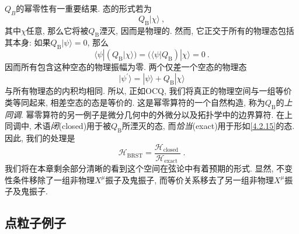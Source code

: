 $Q_B$的幂零性有一重要结果. 态的形式若为
\begin{equation}\label{4.2.15}
Q_{\mathrm{B}}|\chi\rangle \:,
\end{equation}
其中$\chi$任意, 那么它将被$Q_{\mathrm{B}}$湮灭, 因而是物理的. 然而, 它正交于所有的物理态包括其本身: 如果$Q_{\mathrm{B}}|\psi\rangle=0$, 那么
\begin{equation}
\langle\psi| (Q_{\mathrm{B}}|\chi\rangle)= (\langle\psi| Q_{\mathrm{B}})|\chi\rangle=0 \:. \label{4.2.16}
\end{equation}
因而所有包含这种空态的物理振幅为零. 两个仅差一个空态的物理态
\begin{equation}
\lvert \psi^{\prime} \rangle=|\psi\rangle+Q_{\mathrm{B}}|\chi\rangle \label{4.2.17}
\end{equation}
与所有物理态的内积均相同. 所以, 正如OCQ, 我们将真正的物理空间与一组等价类等同起来, 相差空态的态是等价的. 这是幂零算符的一个自然构造, 称为$Q_{\mathrm{B}}$的\emph{上同调}. 幂零算符的另一例子是微分几何中的外微分以及拓扑学中的边界算符. 在上同调中, 术语\emph{闭}(closed)用于被$Q_{\mathrm{B}}$所湮灭的态, 而\emph{恰当}(exact)用于形如\eqref{4.2.15}的态. 因此, 我们的处理是
\begin{equation}
\mathscr{H}_{\mathrm{BRST}}=\frac{\mathscr{H}_{\text {closed }}}{\mathscr{H}_{\text {exact }}} \:.\label{4.2.18}
\end{equation}
我们将在本章剩余部分清晰的看到这个空间在弦论中有着预期的形式. 显然, 不变性条件移除了一组非物理$X^\mu$振子及鬼振子, 而等价关系移去了另一组非物理$X^\mu$振子及鬼振子.

\subsection*{点粒子例子}


